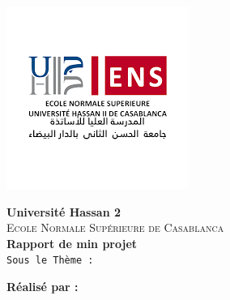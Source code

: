 \documentclass[a4paper,12pt]{report}
\begin{document}
  
\begin{titlepage}
   \begin{sffamily}
    \begin{minipage}{0.65\textwidth}
      \begin{flushleft}
          \includegraphics[scale=0.5]{outils-images/ens logo.png}
      \end{flushleft}
          
        
      \end{minipage}
        \hspace{\fill}
    
     
    \begin{center}
     

     \vspace{1.5cm}
     \textbf{\large Université Hassan 2}\\
     \textsc{Ecole Normale Supérieure de Casablanca}\\[2.8cm]
     
     \textbf{\huge Rapport de min projet}\\[0.5cm]
     
     \texttt{Sous le Thème :} \\[0.4cm]
     

\setlength{\fboxsep}{2ex} 
\setlength {\fboxrule}{2pt}
     
    \begin{minipage}{0.5\textwidth}
      \begin{flushleft} \large
      \vspace{16mm}
       \textbf{Réalisé par :}
       

\end{flushleft}
\end{minipage}
\end{center}
\end{sffamily}
\end{titlepage}
\end{document}
